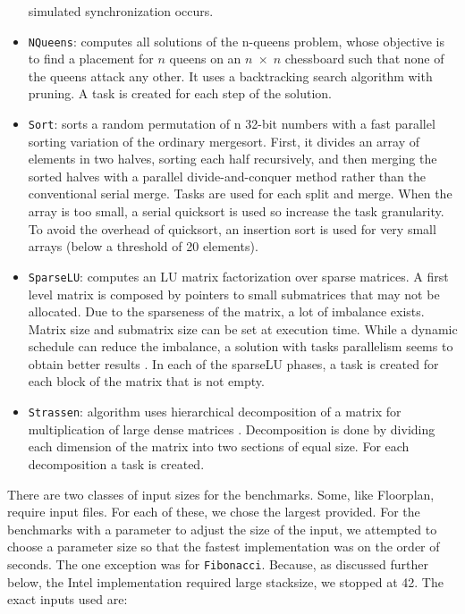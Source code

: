 \documentclass[sigconf]{acmart}
\begin{document}
\begin{itemize}
simulated synchronization   occurs. 
\item \texttt{NQueens}: computes  all  solutions  of  the n-queens
problem, whose objective is to find a placement for $n$ queens on an $n \;
\times \; n$ chessboard such that none of the queens attack any other. It uses
a backtracking search algorithm with pruning. A task is created for each step
of the solution.
\item \texttt{Sort}: sorts a random permutation of n 32-bit numbers with  a
fast  parallel  sorting  variation  \cite{mergesort}  of  the  ordinary
mergesort.  First, it divides an array of elements in two halves, sorting  each
half  recursively,  and  then  merging  the  sorted halves with a parallel
divide-and-conquer method rather than the  conventional  serial  merge.  Tasks
are  used  for  each  split and merge. When the array is too small, a serial
quicksort is used  so increase  the  task  granularity.  To  avoid  the
overhead of  quicksort,  an insertion  sort  is  used  for  very  small  arrays
(below a threshold of 20 elements).
\item \texttt{SparseLU}: computes an LU matrix factorization over
sparse matrices. A first level matrix is composed by pointers to  small
submatrices  that  may  not  be  allocated.  Due  to  the sparseness  of  the
matrix,  a  lot  of  imbalance  exists.  Matrix size and submatrix size can be
set at execution time. While a dynamic schedule can reduce the imbalance, a
solution with tasks parallelism seems to obtain better results \cite{}. In each
of the sparseLU  phases,  a  task  is  created  for  each  block  of  the
matrix that is not empty.
\item \texttt{Strassen}: algorithm  uses  hierarchical  decomposition of a
matrix for multiplication of large dense matrices \cite{}. Decomposition is
done by dividing each dimension of the matrix into  two  sections  of  equal
size. For each decomposition a task is created. 
\end{itemize}

There are two classes of input sizes for the benchmarks. Some, like Floorplan,
require input files. For each of these, we chose the largest provided. For the
benchmarks with a parameter to adjust the size of the input, we attempted to 
choose a parameter size so that the fastest implementation was on the order of
seconds. The one exception was for \texttt{Fibonacci}. Because, as discussed
further below, the Intel implementation required large stacksize, we stopped at
42. The exact inputs used are:
\end{document}
